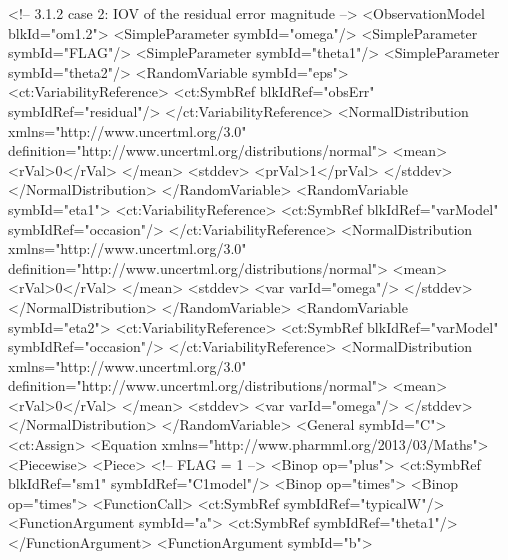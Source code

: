 \documentclass[a4paper,10pt]{article}
\begin{document}
\begin{xmlcode}
<!-- 3.1.2  case 2: IOV of the residual error magnitude -->
<ObservationModel blkId="om1.2">
    <SimpleParameter symbId="omega"/>
    <SimpleParameter symbId="FLAG"/>
    <SimpleParameter symbId="theta1"/>
    <SimpleParameter symbId="theta2"/>
    <RandomVariable symbId="eps">
        <ct:VariabilityReference>
            <ct:SymbRef blkIdRef="obsErr" symbIdRef="residual"/>
        </ct:VariabilityReference>
        <NormalDistribution xmlns="http://www.uncertml.org/3.0" definition="http://www.uncertml.org/distributions/normal">
            <mean>
                <rVal>0</rVal>
            </mean>
            <stddev>
                <prVal>1</prVal>
            </stddev>
        </NormalDistribution>
    </RandomVariable>
    <RandomVariable symbId="eta1">
        <ct:VariabilityReference>
            <ct:SymbRef blkIdRef="varModel" symbIdRef="occasion"/>
        </ct:VariabilityReference>
        <NormalDistribution xmlns="http://www.uncertml.org/3.0" definition="http://www.uncertml.org/distributions/normal">
            <mean>
                <rVal>0</rVal>
            </mean>
            <stddev>
                <var varId="omega"/> 
            </stddev>
        </NormalDistribution>
    </RandomVariable>
    <RandomVariable symbId="eta2">
        <ct:VariabilityReference>
            <ct:SymbRef blkIdRef="varModel" symbIdRef="occasion"/>
        </ct:VariabilityReference>
        <NormalDistribution xmlns="http://www.uncertml.org/3.0" definition="http://www.uncertml.org/distributions/normal">
            <mean>
                <rVal>0</rVal>
            </mean>
            <stddev>
                <var varId="omega"/>
            </stddev>
        </NormalDistribution>
    </RandomVariable>
    <General symbId="C">
        <ct:Assign>
            <Equation xmlns="http://www.pharmml.org/2013/03/Maths">
                <Piecewise>
                    <Piece>                                <!-- FLAG = 1 -->
                        <Binop op="plus">
                            <ct:SymbRef blkIdRef="sm1" symbIdRef="C1model"/>
                            <Binop op="times">
                                <Binop op="times">
                                    <FunctionCall>
                                        <ct:SymbRef symbIdRef="typicalW"/>
                                        <FunctionArgument symbId="a">
                                            <ct:SymbRef symbIdRef="theta1"/>
                                        </FunctionArgument>
                                        <FunctionArgument symbId="b">

\end{xmlcode}
\end{document}
